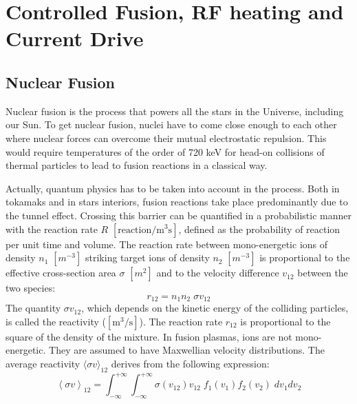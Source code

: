 
\chapter{Controlled Fusion, RF heating and Current Drive}
\label{chap:fusion_and_rf}
\margintoc

\section{Nuclear Fusion}
Nuclear fusion is the process that powers all the stars in the Universe, including our Sun. To get nuclear fusion, nuclei have to come close enough to each other where nuclear forces can overcome their mutual electrostatic repulsion. This would require temperatures of the order of 720 keV for head-on collisions of thermal particles to lead to fusion reactions in a classical way. 

Actually, quantum physics has to be taken into account in the process. Both in tokamaks and in stars interiors, fusion reactions take place predominantly due to the tunnel effect. Crossing this barrier can be quantified in a probabilistic manner with the reaction rate $R$ $[\mathrm{reaction/m^3 s}]$, defined as the probability of reaction per unit time and volume. 
The reaction rate between mono-energetic ions of density $n_1$ $[\si{m}^{-3}]$ striking target ions of density $n_2$ $[\si{m}^{-3}]$ is proportional to the effective cross-section area $\sigma$ $[\si{m}^2]$ and to the velocity difference $v_{12}$ between the two species:
\begin{equation*}
	r_{12} = n_1 n_2 \; \sigma v_{12}
\end{equation*}
The quantity  $\sigma v_{12}$, which depends on the kinetic energy of the colliding particles, is called the reactivity ($\mathrm{[m^3/s]}$). The reaction rate $r_{12}$ is proportional to the square of the density of the mixture. In fusion plasmas, ions are not mono-energetic. They are assumed to have Maxwellian velocity distributions. The average reactivity $\langle \sigma v \rangle_{12}$ derives from the following expression:
\begin{equation*}
	\left < \sigma v \right >_{12} 
	= \int_{-\infty}^{+\infty} \int_{-\infty}^{+\infty} 
	\sigma(v_{12}) v_{12}\;  f_1(v_1) f_2(v_2) \; dv_1dv_2
\end{equation*}

